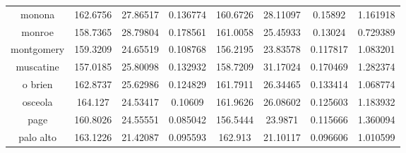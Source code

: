 \begin{table}[H]
\begin{tabular}{|c|ccc|ccc|c|}
monona        & 162.6756 & 27.86517       & 0.136774 & 160.6726 & 28.11097       & 0.15892  & 1.161918 \\
monroe        & 158.7365 & 28.79804       & 0.178561 & 161.0058 & 25.45933       & 0.13024  & 0.729389 \\
montgomery    & 159.3209 & 24.65519       & 0.108768 & 156.2195 & 23.83578       & 0.117817 & 1.083201 \\
muscatine     & 157.0185 & 25.80098       & 0.132932 & 158.7209 & 31.17024       & 0.170469 & 1.282374 \\
o brien       & 162.8737 & 25.62986       & 0.124829 & 161.7911 & 26.34465       & 0.133414 & 1.068774 \\
osceola       & 164.127  & 24.53417       & 0.10609  & 161.9626 & 26.08602       & 0.125603 & 1.183932 \\
page          & 160.8026 & 24.55551       & 0.085042 & 156.5444 & 23.9871        & 0.115666 & 1.360094 \\
palo alto     & 163.1226 & 21.42087       & 0.095593 & 162.913  & 21.10117       & 0.096606 & 1.010599 


\\
\hline
\end{tabular}
\end{table}

